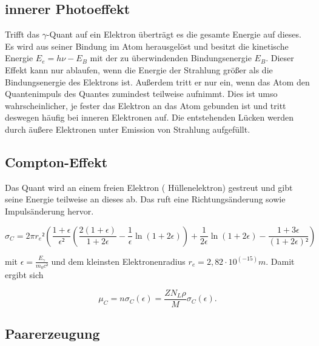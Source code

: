 \subsection{innerer Photoeffekt}
Trifft das $\gamma$-Quant auf ein Elektron überträgt es die gesamte Energie auf dieses. Es wird aus seiner Bindung im Atom herausgelöst und besitzt die kinetische Energie $E_e=h\nu-E_B$ mit der zu überwindenden Bindungsenergie $E_B$. Dieser Effekt kann nur ablaufen, wenn die Energie der Strahlung größer als die Bindungsenergie des Elektrons ist. Außerdem tritt er nur ein, wenn das Atom den Quantenimpuls des Quantes zumindest teilweise aufnimmt. Dies ist umso wahrscheinlicher, je fester das Elektron an das Atom gebunden ist und tritt deswegen häufig bei inneren Elektronen auf. Die entstehenden Lücken werden durch äußere Elektronen unter Emission von Strahlung aufgefüllt.

\subsection{Compton-Effekt}

Das Quant wird an einem freien Elektron ( Hüllenelektron) gestreut und gibt seine Energie teilweise an dieses ab. Das ruft eine Richtungsänderung sowie Impulsänderung hervor.

\begin{equation}
\sigma_C=2\pi  r_e²\left(\frac{1+\epsilon}{\epsilon²}\left(\frac{2(1+\epsilon)}{1+2\epsilon}-\frac{1}{\epsilon}\ln(1+2\epsilon)\right)+\frac{1}{2\epsilon}\ln(1+2\epsilon)-\frac{1+3\epsilon}{(1+2\epsilon)²}\right)
\end{equation}

mit $\epsilon=\frac{E_{\gamma}}{m_0c²}$ und dem kleinsten Elektronenradius $r_e=2,82\cdot 10^(-15)m$. Damit ergibt sich

\begin{equation}
\mu_C=n\sigma_C(\epsilon)=\frac{Z N_L \rho}{M}\sigma_C(\epsilon).
\end{equation}

\subsection{Paarerzeugung}


